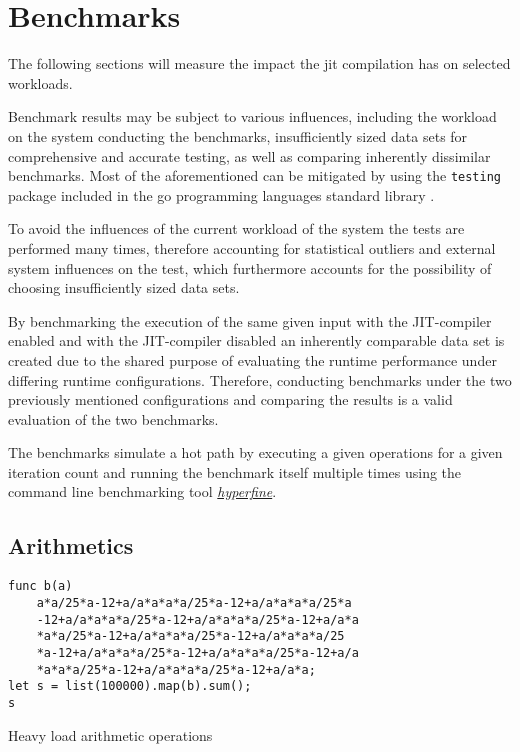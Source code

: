 \chapter{Benchmarks}
\label{sec:benchmarks}

The following sections will measure the impact the jit compilation has on
selected workloads.

Benchmark results may be subject to various influences, including the workload
on the system conducting the benchmarks, insufficiently sized data sets for
comprehensive and accurate testing, as well as comparing inherently dissimilar
benchmarks. Most of the aforementioned can be mitigated by using the
\texttt{testing} package included in the go programming languages standard
library \cite{go_testing}. 

To avoid the influences of the current workload of the system the tests are
performed many times, therefore accounting for statistical outliers and
external system influences on the test, which furthermore accounts for the
possibility of choosing insufficiently sized data sets.

By benchmarking the execution of the same given input with the JIT-compiler
enabled and with the JIT-compiler disabled an inherently comparable data set is
created due to the shared purpose of evaluating the runtime performance under
differing runtime configurations. Therefore, conducting benchmarks under the
two previously mentioned configurations and comparing the results is a valid
evaluation of the two benchmarks.

The benchmarks simulate a hot path by executing a given operations for a given
iteration count and running the benchmark itself multiple times using the
command line benchmarking tool
\href{https://github.com/sharkdp/hyperfine}{\textit{hyperfine}}.


\section{Arithmetics}

\begin{listing}[H]
    \begin{verbatim}
func b(a)
    a*a/25*a-12+a/a*a*a*a/25*a-12+a/a*a*a*a/25*a
    -12+a/a*a*a*a/25*a-12+a/a*a*a*a/25*a-12+a/a*a
    *a*a/25*a-12+a/a*a*a*a/25*a-12+a/a*a*a*a/25
    *a-12+a/a*a*a*a/25*a-12+a/a*a*a*a/25*a-12+a/a
    *a*a*a/25*a-12+a/a*a*a*a/25*a-12+a/a*a;
let s = list(100000).map(b).sum();
s
    \end{verbatim}
    \caption{Heavy load arithmetic operations}
    \label{code:benchmark-arithmetics}
\end{listing}

